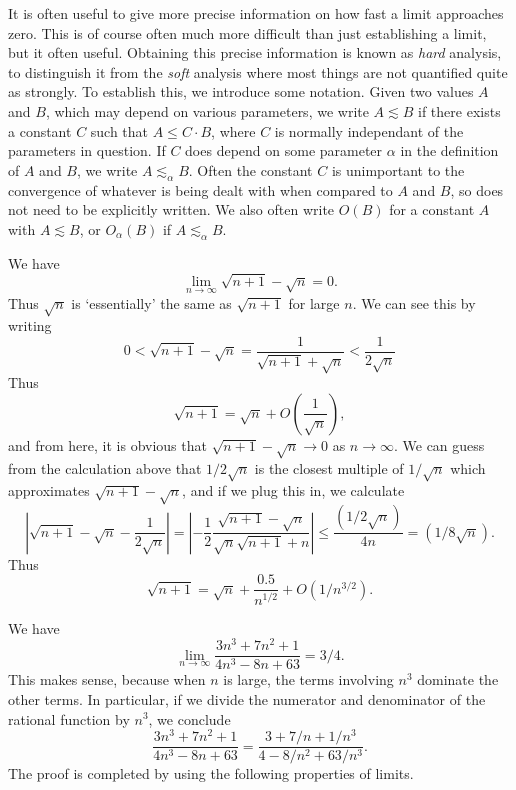 It is often useful to give more precise information on how fast a limit approaches zero. This is of course often much more difficult than just establishing a limit, but it often useful. Obtaining this precise information is known as \emph{hard} analysis, to distinguish it from the \emph{soft} analysis where most things are not quantified quite as strongly. To establish this, we introduce some notation. Given two values $A$ and $B$, which may depend on various parameters, we write $A \lesssim B$ if there exists a constant $C$ such that $A \leq C \cdot B$, where $C$ is normally independant of the parameters in question. If $C$ does depend on some parameter $\alpha$ in the definition of $A$ and $B$, we write $A \lesssim_\alpha B$. Often the constant $C$ is unimportant to the convergence of whatever is being dealt with when compared to $A$ and $B$, so does not need to be explicitly written. We also often write $O(B)$ for a constant $A$ with $A \lesssim B$, or $O_\alpha(B)$ if $A \lesssim_\alpha B$.

\begin{example}
    We have
    \[ \lim_{n \to \infty} \sqrt{n+1} - \sqrt{n} = 0. \]
    Thus $\sqrt{n}$ is `essentially' the same as $\sqrt{n+1}$ for large $n$. We can see this by writing
    \[ 0 < \sqrt{n+1} - \sqrt{n} = \frac{1}{\sqrt{n+1} + \sqrt{n}} < \frac{1}{2\sqrt{n}} \]
    Thus
    \[ \sqrt{n+1} = \sqrt{n} + O \left( \frac{1}{\sqrt{n}} \right), \]
    and from here, it is obvious that $\sqrt{n+1} - \sqrt{n} \to 0$ as $n \to \infty$. We can guess from the calculation above that $1/2\sqrt{n}$ is the closest multiple of $1/\sqrt{n}$ which approximates $\sqrt{n+1} - \sqrt{n}$, and if we plug this in, we calculate
    \[ \left| \sqrt{n+1} - \sqrt{n} - \frac{1}{2\sqrt{n}} \right| = \left| -\frac{1}{2} \frac{\sqrt{n+1} - \sqrt{n}}{\sqrt{n} \sqrt{n+1} + n} \right| \leq \frac{(1/2\sqrt{n})}{4n} = (1/8\sqrt{n}). \]
    Thus
    \[ \sqrt{n+1} = \sqrt{n} + \frac{0.5}{n^{1/2}} + O(1/n^{3/2}). \]
\end{example}

\begin{example}
    We have
    \[ \lim_{n \to \infty} \frac{3n^3 + 7n^2 + 1}{4n^3 - 8n + 63} = 3/4. \]
    This makes sense, because when $n$ is large, the terms involving $n^3$ dominate the other terms. In particular, if we divide the numerator and denominator of the rational function by $n^3$, we conclude
    \[ \frac{3n^3 + 7n^2 + 1}{4n^3 - 8n + 63} = \frac{3 + 7/n + 1/n^3}{4 - 8/n^2 + 63/n^3}. \]
    The proof is completed by using the following properties of limits.
\end{example}

